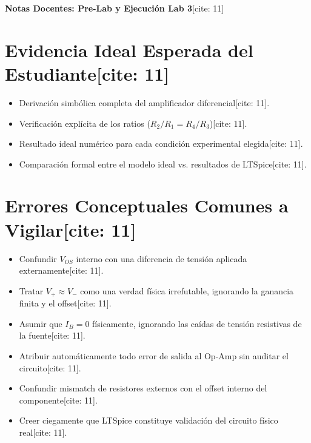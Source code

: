 \documentclass[11pt, a4paper]{article}
\begin{document}
\begin{center}
    \Large\textbf{\textcolor{ucbblue}{Notas Docentes: Pre-Lab y Ejecución Lab 3}}[cite: 11]
\end{center}

\section*{Evidencia Ideal Esperada del Estudiante[cite: 11]}
\begin{itemize}
    \item Derivación simbólica completa del amplificador diferencial[cite: 11].
    \item Verificación explícita de los ratios ($R_2/R_1 = R_4/R_3$)[cite: 11].
    \item Resultado ideal numérico para cada condición experimental elegida[cite: 11].
    \item Comparación formal entre el modelo ideal vs. resultados de LTSpice[cite: 11].
\end{itemize}

\section*{Errores Conceptuales Comunes a Vigilar[cite: 11]}
\begin{itemize}
    \item Confundir $V_{OS}$ interno con una diferencia de tensión aplicada externamente[cite: 11].
    \item Tratar $V_+ \approx V_-$ como una verdad física irrefutable, ignorando la ganancia finita y el offset[cite: 11].
    \item Asumir que $I_B = 0$ físicamente, ignorando las caídas de tensión resistivas de la fuente[cite: 11].
    \item Atribuir automáticamente todo error de salida al Op-Amp sin auditar el circuito[cite: 11].
    \item Confundir mismatch de resistores externos con el offset interno del componente[cite: 11].
    \item Creer ciegamente que LTSpice constituye validación del circuito físico real[cite: 11].
\end{itemize}
\end{document}
